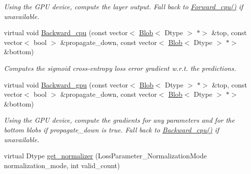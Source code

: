 \begin{DoxyCompactItemize}
\begin{DoxyCompactList}\small\item\em Using the G\+PU device, compute the layer output. Fall back to \mbox{\hyperlink{classcaffe_1_1_sigmoid_cross_entropy_loss_layer_aa3e7f285742d862435d5e49d13e05064}{Forward\+\_\+cpu()}} if unavailable. \end{DoxyCompactList}\item 
virtual void \mbox{\hyperlink{classcaffe_1_1_sigmoid_cross_entropy_loss_layer_adf71e6f3bc5952c721c3bdd965612aed}{Backward\+\_\+cpu}} (const vector$<$ \mbox{\hyperlink{classcaffe_1_1_blob}{Blob}}$<$ Dtype $>$ $\ast$$>$ \&top, const vector$<$ bool $>$ \&propagate\+\_\+down, const vector$<$ \mbox{\hyperlink{classcaffe_1_1_blob}{Blob}}$<$ Dtype $>$ $\ast$$>$ \&bottom)
\begin{DoxyCompactList}\small\item\em Computes the sigmoid cross-\/entropy loss error gradient w.\+r.\+t. the predictions. \end{DoxyCompactList}\item 
\mbox{\label{classcaffe_1_1_sigmoid_cross_entropy_loss_layer_a3e1aa9138092aad788dc72fef27041f2}} 
virtual void \mbox{\hyperlink{classcaffe_1_1_sigmoid_cross_entropy_loss_layer_a3e1aa9138092aad788dc72fef27041f2}{Backward\+\_\+gpu}} (const vector$<$ \mbox{\hyperlink{classcaffe_1_1_blob}{Blob}}$<$ Dtype $>$ $\ast$$>$ \&top, const vector$<$ bool $>$ \&propagate\+\_\+down, const vector$<$ \mbox{\hyperlink{classcaffe_1_1_blob}{Blob}}$<$ Dtype $>$ $\ast$$>$ \&bottom)
\begin{DoxyCompactList}\small\item\em Using the G\+PU device, compute the gradients for any parameters and for the bottom blobs if propagate\+\_\+down is true. Fall back to \mbox{\hyperlink{classcaffe_1_1_sigmoid_cross_entropy_loss_layer_a025360b1de1fefbc4684e43603394a22}{Backward\+\_\+cpu()}} if unavailable. \end{DoxyCompactList}\item 
virtual Dtype \mbox{\hyperlink{classcaffe_1_1_sigmoid_cross_entropy_loss_layer_accab5e6e98e83dec65af0ecb49deb36b}{get\+\_\+normalizer}} (Loss\+Parameter\+\_\+\+Normalization\+Mode normalization\+\_\+mode, int valid\+\_\+count)
\end{DoxyCompactItemize}
